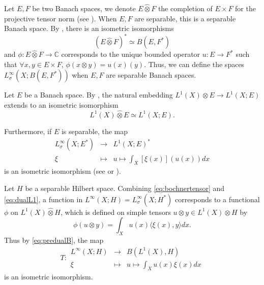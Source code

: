 \documentclass{article}
\theoremstyle{definition}
\theoremstyle{remark}
\numberwithin{equation}{section}
\newcommand{\C}{\mathbb{C}}
\newcommand{\fonction}[5]{#1: \begin{array}{ccc}
#2 & \rightarrow & #3 \\
 #4 & \longmapsto & #5 \end{array}}
\newcommand{\fon}[4]{\begin{array}{ccc}
#1 & \rightarrow & #2 \\
#3 & \longmapsto & #4 \end{array}}
\begin{document}
Let $E,F$ be two Banach spaces, we denote $E\hat{\otimes}F$ the completion of $E\times F$ for the projective tensor norm (see \cite[Ch. VIII]{diestel1977vector}). When $E,F$ are separable, this is a separable Banach space. By \cite[Ch. VIII.2, Coro. 2]{diestel1977vector}, there is an isometric isomorphisms \begin{equation}
    \label{eq:predualB}
\left(E\hat{\otimes}F\right)^*\simeq B\left(E,F^*\right)\end{equation} and $\phi:E\hat{\otimes}F\to \C$ corresponds to the unique bounded operator $u:E\to F^*$ such that $\forall x,y\in E\times F$, $\phi(x\otimes y)=u(x)(y)$. Thus, we can define the spaces $L^\infty_\sigma\left(X;B\left(E,F^*\right)\right)$ when $E,F$ are separable Banach spaces.\medskip

Let $E$ be a Banach space. By \cite[Ch. VIII.1, Ex.10]{diestel1977vector}, the natural embedding $L^1(X)\otimes E\to L^1(X;E)$ extends to an isometric isomorphism \begin{equation}
    \label{eq:bochnertensor} L^1(X)\hat{\otimes} E \simeq L^1(X;E).
\end{equation}

Furthermore, if $E$ is separable, the map \begin{equation}
    \label{eq:dualL1} \fon{L^\infty_\sigma(X;E^*)}{L^1(X;E)^*}{\xi}{u\mapsto \int_X  \left[\xi(x)\right](u(x)) dx}
\end{equation}is an isometric isomorphism (see \cite[Thm. 1.16]{coine-these} or \cite[Prop. 2.20, 2.26 and Thm. 2.29]{Pisier_2016}).\medskip

Let $H$ be a separable Hilbert space. Combining \eqref{eq:bochnertensor} and \eqref{eq:dualL1}, a function in $L^\infty(X;H)=L^\infty_\sigma(X;H^*)$ corresponds to a functional $\phi$ on $L^1(X)\hat{\otimes} H$, which is defined on simple tensors $u\otimes y\in L^1(X)\otimes H$ by $$\phi(u\otimes y)=\int_X u(x)\langle \xi(x),y\rangle dx.$$ Thus by \eqref{eq:predualB}, the map \begin{equation}
    \label{eq:isometric-integration}\fonction{T}{L^\infty(X;H)}{B(L^1(X),H)}{\xi}{u\mapsto \int_X u(x)\xi(x)dx}
\end{equation}is an isometric isomorphism.\medskip
\end{document}
